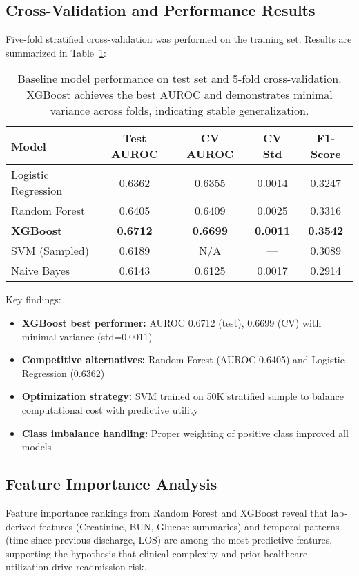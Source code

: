 \documentclass[runningheads]{llncs}
\begin{document}
\subsection{Cross-Validation and Performance Results}
Five-fold stratified cross-validation was performed on the training set. Results are summarized in Table~\ref{tab:cv_results}:

\begin{table}[ht]
\centering
\begin{tabular}{|l|c|c|c|c|}
\hline
\textbf{Model} & \textbf{Test AUROC} & \textbf{CV AUROC} & \textbf{CV Std} & \textbf{F1-Score} \\
\hline
Logistic Regression & 0.6362 & 0.6355 & 0.0014 & 0.3247 \\
Random Forest & 0.6405 & 0.6409 & 0.0025 & 0.3316 \\
\textbf{XGBoost} & \textbf{0.6712} & \textbf{0.6699} & \textbf{0.0011} & \textbf{0.3542} \\
SVM (Sampled) & 0.6189 & N/A & — & 0.3089 \\
Naive Bayes & 0.6143 & 0.6125 & 0.0017 & 0.2914 \\
\hline
\end{tabular}
\caption{Baseline model performance on test set and 5-fold cross-validation. XGBoost achieves the best AUROC and demonstrates minimal variance across folds, indicating stable generalization.}
\label{tab:cv_results}
\end{table}

Key findings:
\begin{itemize}
    \item \textbf{XGBoost best performer:} AUROC 0.6712 (test), 0.6699 (CV) with minimal variance (std=0.0011)
    \item \textbf{Competitive alternatives:} Random Forest (AUROC 0.6405) and Logistic Regression (0.6362)
    \item \textbf{Optimization strategy:} SVM trained on 50K stratified sample to balance computational cost with predictive utility
    \item \textbf{Class imbalance handling:} Proper weighting of positive class improved all models
\end{itemize}

\subsection{Feature Importance Analysis}
Feature importance rankings from Random Forest and XGBoost reveal that lab-derived features (Creatinine, BUN, Glucose summaries) and temporal patterns (time since previous discharge, LOS) are among the most predictive features, supporting the hypothesis that clinical complexity and prior healthcare utilization drive readmission risk.
\end{document}
